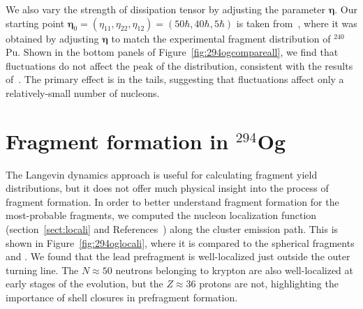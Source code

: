 We also vary the strength of dissipation tensor by adjusting the parameter $\mathbf{\eta}$. Our starting point $\mathbf{\eta}_0 = (\eta_{11},\eta_{22},\eta_{12}) = (50\hbar,40\hbar,5\hbar)$ is taken from~\cite{Sadhukhan2016}, where it was obtained by adjusting $\mathbf{\eta}$ to match the experimental fragment distribution of $^{240}$Pu. Shown in the bottom panels of Figure~\ref{fig:294ogcompareall}, we find that fluctuations do not affect the peak of the distribution, consistent with the results of~\cite{Randrup2011,Sierk2017,Sadhukhan2017}. The primary effect is in the tails, suggesting that fluctuations affect only a relatively-small number of nucleons.

\section{Fragment formation in $^{294}$Og}

The Langevin dynamics approach is useful for calculating fragment yield distributions, but it does not offer much physical insight into the process of fragment formation. In order to better understand fragment formation for the most-probable fragments, we computed the nucleon localization function (section~\ref{sect:locali} and References~\cite{Zhang2016,Sadhukhan2017}) along the cluster emission path. This is shown in Figure~\ref{fig:294oglocali}, where it is compared to the spherical fragments {\Pb} and {\Kr}. We found that the lead prefragment is well-localized just outside the outer turning line. The $N\approx50$ neutrons belonging to krypton are also well-localized at early stages of the evolution, but the $Z\approx36$ protons are not, highlighting the importance of shell closures in prefragment formation.

